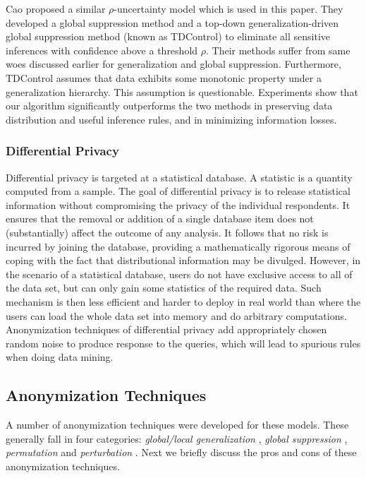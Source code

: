 Cao \etal \cite{Cao:2010:rho} proposed a similar $\rho$-uncertainty model
which is used in this paper.
They developed a global suppression method and a top-down
generalization-driven global suppression method (known as TDControl)
to eliminate all sensitive inferences with confidence above
a threshold $\rho$.
Their methods suffer from same woes discussed earlier for generalization and
global suppression.
Furthermore, TDControl
assumes that data exhibits some monotonic property under a generalization
hierarchy. This assumption is questionable.
Experiments show that our algorithm significantly outperforms the
two methods in preserving data distribution and useful
inference rules, and in minimizing information losses.

\subsubsection{Differential Privacy}

Differential privacy \cite{Dwork08:diff:survey}
is targeted at a statistical database. A statistic is a quantity computed from a sample.
The goal of differential privacy is to release statistical information without
compromising the privacy of the individual respondents.
It ensures that the removal or addition of a single database item does not
(substantially) affect the outcome of any analysis.
It follows that no risk is incurred by joining the database,
providing a mathematically rigorous means of coping with
the fact that distributional information may be divulged.
However, in the scenario of a statistical database,
users do not have exclusive access to all of the data set, but can only gain some statistics of the required data.
Such mechanism is then less efficient and harder to
deploy in real world than where the users can load the
whole data set into memory and do arbitrary computations.
Anonymization techniques of differential privacy add appropriately chosen random noise to produce response to the queries,
which will lead to spurious rules when doing data mining.

\subsection{Anonymization Techniques}

A number of anonymization techniques
were developed for these models.
These generally fall in four categories\cite{Machanavajjhala12}: {\em
global/local generalization}
\cite{Terrovitis:2008:PAS,He:2009:ASD,Cao:2010:rho}, {\em global suppression} \cite{Xu:2008:ATD,Cao:2010:rho},
{\em permutation} \cite{2011:TKDE:Anonymous} and {\em perturbation}
\cite{Zhang:2007:agg,ChenMFDX11:Diff,Javier2012,WangW05}. Next we briefly discuss the pros and
cons of these anonymization techniques.

